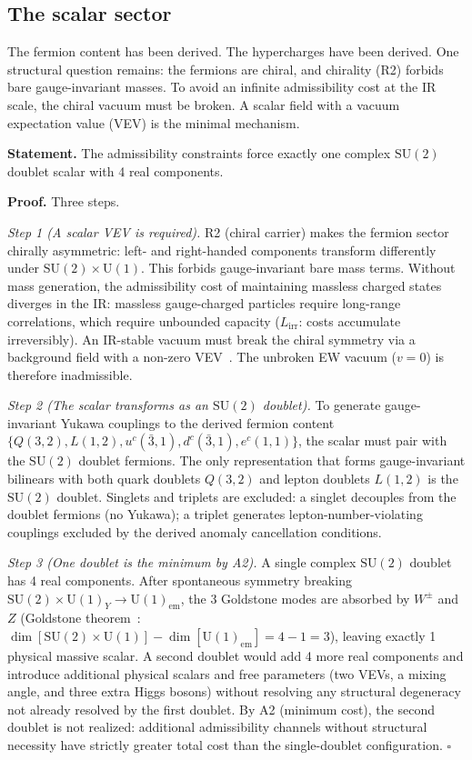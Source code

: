 \documentclass[11pt]{article}
\newcommand{\SU}{\mathrm{SU}}
\newcommand{\U}{\mathrm{U}}
\begin{document}
\subsection{The scalar sector}
\label{sec:higgs}

The fermion content has been derived.  The hypercharges have been derived.  One structural question remains: the fermions are chiral, and chirality (R2) forbids bare gauge-invariant masses.  To avoid an infinite admissibility cost at the IR scale, the chiral vacuum must be broken.  A scalar field with a vacuum expectation value (VEV) is the minimal mechanism.

\begin{tcolorbox}[apfbox, title={Theorem $T_{\mathrm{Higgs}}$ (Scalar Sector)}]
\textbf{Statement.}  The admissibility constraints force exactly one complex $\SU(2)$ doublet scalar with 4 real components.

\smallskip\noindent\textbf{Proof.}  Three steps.

\textit{Step 1 (A scalar VEV is required).}  R2 (chiral carrier) makes the fermion sector chirally asymmetric: left- and right-handed components transform differently under $\SU(2) \times \U(1)$.  This forbids gauge-invariant bare mass terms.  Without mass generation, the admissibility cost of maintaining massless charged states diverges in the IR: massless gauge-charged particles require long-range correlations, which require unbounded capacity ($L_{\mathrm{irr}}$: costs accumulate irreversibly).  An IR-stable vacuum must break the chiral symmetry via a background field with a non-zero VEV~\cite{Englert1964,Higgs1964}.  The unbroken EW vacuum ($v = 0$) is therefore inadmissible.

\textit{Step 2 (The scalar transforms as an $\SU(2)$ doublet).}  To generate gauge-invariant Yukawa couplings to the derived fermion content $\{Q(3,2), L(1,2), u^c(\bar{3},1), d^c(\bar{3},1), e^c(1,1)\}$, the scalar must pair with the $\SU(2)$ doublet fermions.  The only representation that forms gauge-invariant bilinears with both quark doublets $Q(3,2)$ and lepton doublets $L(1,2)$ is the $\SU(2)$ doublet.  Singlets and triplets are excluded: a singlet decouples from the doublet fermions (no Yukawa); a triplet generates lepton-number-violating couplings excluded by the derived anomaly cancellation conditions.

\textit{Step 3 (One doublet is the minimum by A2).}  A single complex $\SU(2)$ doublet has 4 real components.  After spontaneous symmetry breaking $\SU(2) \times \U(1)_Y \to \U(1)_{\mathrm{em}}$, the 3 Goldstone modes are absorbed by $W^\pm$ and $Z$ (Goldstone theorem~\cite{Goldstone1962}: $\dim[\SU(2) \times \U(1)] - \dim[\U(1)_{\mathrm{em}}] = 4 - 1 = 3$), leaving exactly 1 physical massive scalar.  A second doublet would add 4 more real components and introduce additional physical scalars and free parameters (two VEVs, a mixing angle, and three extra Higgs bosons) without resolving any structural degeneracy not already resolved by the first doublet.  By A2 (minimum cost), the second doublet is not realized: additional admissibility channels without structural necessity have strictly greater total cost than the single-doublet configuration.  $\square$
\end{tcolorbox}
\end{document}
